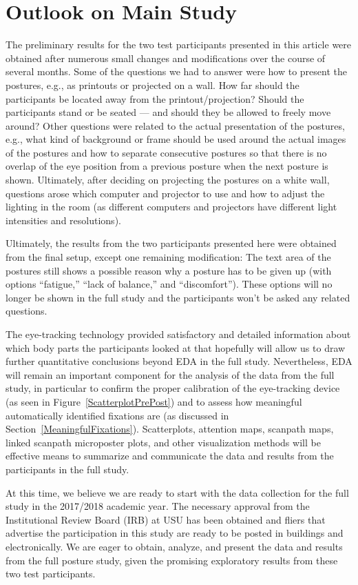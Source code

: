 \documentclass[11pt]{asaproc}
\begin{document}
\section{Outlook on Main Study}  
\label{Outlook}


The preliminary results for the two test participants presented in this article were obtained after
numerous small changes and modifications over the course of several months.
Some of the questions we had to answer were how to present the postures,
e.g., as printouts or projected on a wall. How far should the participants be located
away from the printout/projection? Should the participants stand or be seated ---
and should they be allowed to freely move around? 
Other questions were related to the actual presentation of the postures, e.g., what kind
of background or frame should be used around the actual images of the postures and
how to separate consecutive postures so that there is no overlap of the eye position
from a previous posture when the next posture is shown. Ultimately,
after deciding on projecting the postures on a white wall, questions arose which
computer and projector to use and how to adjust the lighting in the room
(as different computers and projectors have different light intensities and resolutions).

Ultimately, the results from the two participants presented here were obtained from
the final setup,  except one remaining modification: The text area of the postures
still shows a possible reason why a posture has to be given up (with options
``fatigue,'' ``lack of balance,'' and ``discomfort''). These options will no
longer be shown in the full study and the participants won't be asked any
related questions.

The eye-tracking technology provided satisfactory and detailed information about which body parts the participants looked at
that hopefully will allow us to draw further quantitative conclusions beyond EDA in the full study.
Nevertheless, EDA will remain an important component for the analysis of the data from the full study,
in particular to confirm the proper calibration of the eye-tracking device (as seen in Figure~\ref{ScatterplotPrePost}) and
to assess how meaningful automatically identified fixations are (as discussed in Section~\ref{MeaningfulFixations}).
Scatterplots, attention maps, scanpath maps, linked scanpath microposter plots, and other visualization methods will 
be effective means to summarize and communicate the data and results from the participants in the full study.

At this time, we believe we are ready to start with the data collection for the full study
in the 2017/2018 academic year. The necessary approval from the Institutional Review Board (IRB)
at USU has been obtained and fliers that advertise the participation in this study are
ready to be posted in buildings and electronically. We are eager to obtain, analyze, and
present the data and results from the full posture study, given the promising
exploratory results from these two test participants.





\end{document}
